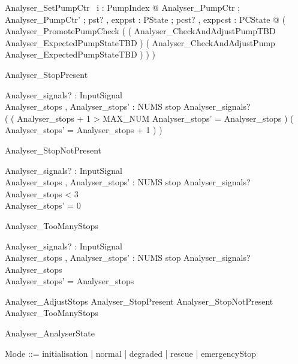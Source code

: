\documentclass{article}
\begin{document}
\begin{zed}
	Analyser\_SetPumpCtr ~\forall i : PumpIndex @ \exists Analyser\_PumpCtr ; Analyser\_PumpCtr' ; pst? , exppst : PState ; pcst? , exppcst : PCState @ ( Analyser\_PromotePumpCheck \land ( ( Analyser\_CheckAndAdjustPumpTBD \land Analyser\_ExpectedPumpStateTBD ) \lor ( Analyser\_CheckAndAdjustPump \land \lnot Analyser\_ExpectedPumpStateTBD ) ) )
\end{zed}

\begin{schema}{Analyser\_StopPresent}

 Analyser\_signals? : \power InputSignal \\
 Analyser\_stops , Analyser\_stops' : NUMS 
\where
 stop \in Analyser\_signals? \\
 ( ( Analyser\_stops + 1 > MAX\_NUM \land Analyser\_stops' = Analyser\_stops ) \lor ( Analyser\_stops' = Analyser\_stops + 1 ) )
\end{schema}

\begin{schema}{Analyser\_StopNotPresent}

 Analyser\_signals? : \power InputSignal \\
 Analyser\_stops , Analyser\_stops' : NUMS 
\where
 stop \notin Analyser\_signals? \land Analyser\_stops < 3 \\
 Analyser\_stops' = 0
\end{schema}

\begin{schema}{Analyser\_TooManyStops}

 Analyser\_signals? : \power InputSignal \\
 Analyser\_stops , Analyser\_stops' : NUMS 
\where
 stop \notin Analyser\_signals? \land Analyser\_stops  \\
 Analyser\_stops' = Analyser\_stops
\end{schema}

\begin{zed}
	Analyser\_AdjustStops  Analyser\_StopPresent \lor Analyser\_StopNotPresent \lor Analyser\_TooManyStops
\end{zed}

\begin{zed}
	Analyser\_AnalyserState 
\end{zed}

\begin{zed}
	Mode ::= initialisation | normal | degraded | rescue | emergencyStop
\end{zed}
\end{document}
